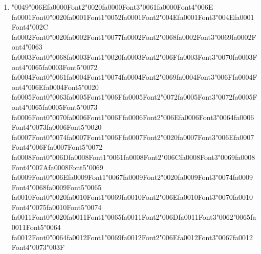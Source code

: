 \documentclass[11pt]{article}
\begin{document}
\begin{enumerate}[label=Q\arabic*., leftmargin=*]
\item {\char"0049}{\char"006E}{\csname fa0000Font2\endcsname\char"0020}{\csname fa0000Font3\endcsname\char"0061}{\csname fa0000Font4\endcsname\char"006E} {\csname fa0001Font0\endcsname\char"0020}{\csname fa0001Font1\endcsname\char"0052}{\csname fa0001Font2\endcsname\char"004E}{\csname fa0001Font3\endcsname\char"004E}{\csname fa0001Font4\endcsname\char"002C} {\csname fa0002Font0\endcsname\char"0020}{\csname fa0002Font1\endcsname\char"0077}{\csname fa0002Font2\endcsname\char"0068}{\csname fa0002Font3\endcsname\char"0069}{\csname fa0002Font4\endcsname\char"0063} {\csname fa0003Font0\endcsname\char"0068}{\csname fa0003Font1\endcsname\char"0020}{\csname fa0003Font2\endcsname\char"006F}{\csname fa0003Font3\endcsname\char"0070}{\csname fa0003Font4\endcsname\char"0065}{\csname fa0003Font5\endcsname\char"0072} {\csname fa0004Font0\endcsname\char"0061}{\csname fa0004Font1\endcsname\char"0074}{\csname fa0004Font2\endcsname\char"0069}{\csname fa0004Font3\endcsname\char"006F}{\csname fa0004Font4\endcsname\char"006E}{\csname fa0004Font5\endcsname\char"0020} {\csname fa0005Font0\endcsname\char"0063}{\csname fa0005Font1\endcsname\char"006F}{\csname fa0005Font2\endcsname\char"0072}{\csname fa0005Font3\endcsname\char"0072}{\csname fa0005Font4\endcsname\char"0065}{\csname fa0005Font5\endcsname\char"0073} {\csname fa0006Font0\endcsname\char"0070}{\csname fa0006Font1\endcsname\char"006F}{\csname fa0006Font2\endcsname\char"006E}{\csname fa0006Font3\endcsname\char"0064}{\csname fa0006Font4\endcsname\char"0073}{\csname fa0006Font5\endcsname\char"0020} {\csname fa0007Font0\endcsname\char"0074}{\csname fa0007Font1\endcsname\char"006F}{\csname fa0007Font2\endcsname\char"0020}{\csname fa0007Font3\endcsname\char"006E}{\csname fa0007Font4\endcsname\char"006F}{\csname fa0007Font5\endcsname\char"0072} {\csname fa0008Font0\endcsname\char"006D}{\csname fa0008Font1\endcsname\char"0061}{\csname fa0008Font2\endcsname\char"006C}{\csname fa0008Font3\endcsname\char"0069}{\csname fa0008Font4\endcsname\char"007A}{\csname fa0008Font5\endcsname\char"0069} {\csname fa0009Font0\endcsname\char"006E}{\csname fa0009Font1\endcsname\char"0067}{\csname fa0009Font2\endcsname\char"0020}{\csname fa0009Font3\endcsname\char"0074}{\csname fa0009Font4\endcsname\char"0068}{\csname fa0009Font5\endcsname\char"0065} {\csname fa0010Font0\endcsname\char"0020}{\csname fa0010Font1\endcsname\char"0069}{\csname fa0010Font2\endcsname\char"006E}{\csname fa0010Font3\endcsname\char"0070}{\csname fa0010Font4\endcsname\char"0075}{\csname fa0010Font5\endcsname\char"0074} {\csname fa0011Font0\endcsname\char"0020}{\csname fa0011Font1\endcsname\char"0065}{\csname fa0011Font2\endcsname\char"006D}{\csname fa0011Font3\endcsname\char"0062}{\char"0065}{\csname fa0011Font5\endcsname\char"0064} {\csname fa0012Font0\endcsname\char"0064}{\csname fa0012Font1\endcsname\char"0069}{\csname fa0012Font2\endcsname\char"006E}{\csname fa0012Font3\endcsname\char"0067}{\csname fa0012Font4\endcsname\char"0073}{\char"003F}\\

\end{enumerate}
\end{document}
